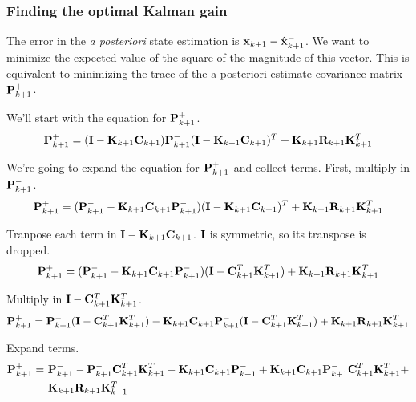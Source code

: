 \subsubsection{Finding the optimal Kalman gain}

The error in the \textit{a posteriori} \gls{state} estimation is
$\mathbf{x}_{k+1} - \hat{\mathbf{x}}_{k+1}^-$. We want to minimize the expected value
of the square of the magnitude of this vector. This is equivalent to minimizing
the trace of the a posteriori estimate covariance matrix $\mathbf{P}_{k+1}^+$.

We'll start with the equation for $\mathbf{P}_{k+1}^+$.
\begin{equation*}
  \mathbf{P}_{k+1}^+ = (\mathbf{I} - \mathbf{K}_{k+1}\mathbf{C}_{k+1})\mathbf{P}_{k+1}^-
    (\mathbf{I} - \mathbf{K}_{k+1}\mathbf{C}_{k+1})^T + \mathbf{K}_{k+1}\mathbf{R}_{k+1}
    \mathbf{K}_{k+1}^T
\end{equation*}

We're going to expand the equation for $\mathbf{P}_{k+1}^+$ and collect terms.
First, multiply in $\mathbf{P}_{k+1}^-$.
\begin{equation*}
  \mathbf{P}_{k+1}^+ =
    (\mathbf{P}_{k+1}^- - \mathbf{K}_{k+1}\mathbf{C}_{k+1}\mathbf{P}_{k+1}^-)
    (\mathbf{I} - \mathbf{K}_{k+1}\mathbf{C}_{k+1})^T + \mathbf{K}_{k+1}\mathbf{R}_{k+1}
    \mathbf{K}_{k+1}^T
\end{equation*}

Tranpose each term in $\mathbf{I} - \mathbf{K}_{k+1}\mathbf{C}_{k+1}$. $\mathbf{I}$ is
symmetric, so its transpose is dropped.
\begin{equation*}
  \mathbf{P}_{k+1}^+ =
    (\mathbf{P}_{k+1}^- - \mathbf{K}_{k+1}\mathbf{C}_{k+1}\mathbf{P}_{k+1}^-)
    (\mathbf{I} - \mathbf{C}_{k+1}^T\mathbf{K}_{k+1}^T) +
    \mathbf{K}_{k+1}\mathbf{R}_{k+1} \mathbf{K}_{k+1}^T
\end{equation*}

Multiply in $\mathbf{I} - \mathbf{C}_{k+1}^T\mathbf{K}_{k+1}^T$.
\begin{equation*}
  \mathbf{P}_{k+1}^+ =
    \mathbf{P}_{k+1}^-(\mathbf{I} - \mathbf{C}_{k+1}^T\mathbf{K}_{k+1}^T) -
    \mathbf{K}_{k+1}\mathbf{C}_{k+1}\mathbf{P}_{k+1}^-
    (\mathbf{I} - \mathbf{C}_{k+1}^T\mathbf{K}_{k+1}^T) +
    \mathbf{K}_{k+1}\mathbf{R}_{k+1} \mathbf{K}_{k+1}^T
\end{equation*}

Expand terms.
\begin{align*}
  \mathbf{P}_{k+1}^+ =~&
    \mathbf{P}_{k+1}^- - \mathbf{P}_{k+1}^-\mathbf{C}_{k+1}^T\mathbf{K}_{k+1}^T -
    \mathbf{K}_{k+1}\mathbf{C}_{k+1}\mathbf{P}_{k+1}^- +
    \mathbf{K}_{k+1}\mathbf{C}_{k+1}\mathbf{P}_{k+1}^-\mathbf{C}_{k+1}^T\mathbf{K}_{k+1}^T + \\
    &\mathbf{K}_{k+1}\mathbf{R}_{k+1} \mathbf{K}_{k+1}^T
\end{align*}

